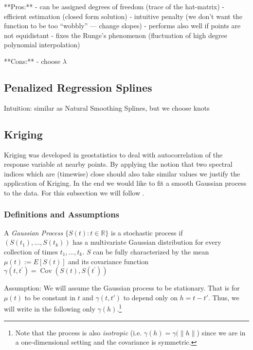 **Pros:**
- can be assigned degrees of freedom (trace of the hat-matrix)
- efficient estimation (closed form solution)
- intuitive penalty (we don't want the function to be too ``wobbly'' --- change slopes)
- performs also well if points are not equidistant
- fixes the Runge's phenomenon (fluctuation of high degree polynomial interpolation)

**Cons:**
- choose $\lambda$

\subsection{Penalized Regression Splines}
\label{sec:Penalized}
Intuition: similar as Natural Smoothing Splines, but we choose knots

\subsection{Kriging}
\label{sec:Kriging}

Kriging was developed in geostatistics to deal with autocorrelation of the response variable at nearby points. By applying the notion that two spectral indices which are (timewise) close should also take similar values we justify the application of Kriging. In the end we would like to fit a smooth Gaussian process to the data. For this subsection we will follow \cite{diggleGaussianModelsGeostatistical2007}.

\subsubsection*{Definitions and Assumptions}

A \textit{Gaussian Process} $\{S(t) : t\in \mathbb R\} $ is a stochastic process if $(S(t_1),\dots,S(t_k))$ has a multivariate Gaussian distribution for every collection of times ${t_1, \dots , t_k}$.
$S$ can be fully characterized by the mean $\mu(t):=E[S(t)]$ and its covariance function $\gamma\left(t, t^{\prime}\right)=\operatorname{Cov}\left(S(t), S\left(t^{\prime}\right)\right)$

Assumption:
We will assume the Gaussian process to be stationary. That is for $\mu(t)$ to be constant in $t$ and $\gamma(t,t')$ to depend only on $h=t-t'$. Thus, we will write in the following only $\gamma(h)$.\footnote{Note that the process is also \textit{isotropic} (i.e. $\gamma(h)=\gamma(\|h\|$) since we are in a one-dimensional setting and the covariance is symmetric.}


